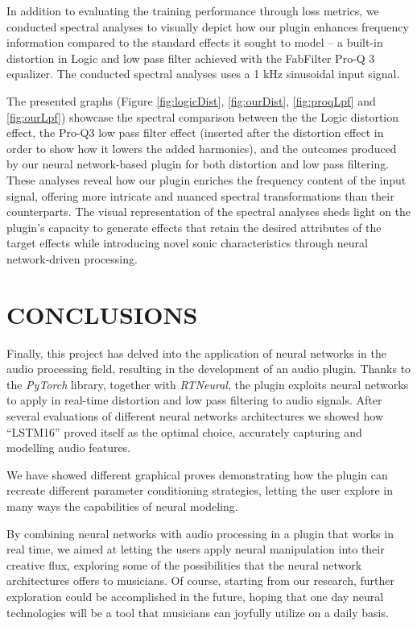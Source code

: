 \documentclass{article}
\newcommand{\quotes}[1]{``#1''}
\begin{document}
\begin{sloppy}
In addition to evaluating the training performance through loss metrics, we conducted spectral analyses to visually depict how our plugin enhances frequency information compared to the standard effects it sought to model – a built-in distortion in Logic and low pass filter achieved with the FabFilter Pro-Q 3 equalizer. The
conducted spectral analyses uses a 1 kHz sinusoidal input signal.

The presented graphs (Figure \ref{fig:logicDist}, \ref{fig:ourDist}, \ref{fig:proqLpf} and \ref{fig:ourLpf}) showcase the spectral comparison between the the Logic distortion effect, the Pro-Q3 low pass filter effect (inserted after the distortion effect in order to show how it lowers the added harmonics), and the outcomes produced by our neural network-based plugin for both distortion and low pass filtering. These analyses reveal how our plugin enriches the frequency content of the input signal, offering more intricate and nuanced spectral transformations than their counterparts. The visual representation of the spectral analyses sheds light on the plugin's capacity to generate effects that retain the desired attributes of the target effects while introducing novel sonic characteristics through neural network-driven processing.

\section{CONCLUSIONS}
\label{sec:conclusions}

Finally, this project has delved into the application of neural networks in the audio processing field, resulting in the development of an audio plugin. Thanks to the \emph{PyTorch} library, together with \emph{RTNeural}, the plugin exploits neural networks to apply in real-time distortion and low pass filtering to audio signals. After several evaluations of different neural networks architectures we showed how \quotes{LSTM16} proved itself as the optimal choice, accurately capturing and modelling audio features.

We have showed different graphical proves demonstrating how the plugin can recreate different parameter conditioning strategies, letting the user explore in many ways the capabilities of neural modeling.

By combining neural networks with audio processing in a plugin that works in real time, we aimed at letting the users apply neural manipulation into their creative flux, exploring some of the possibilities that the neural network architectures offers to musicians. Of course, starting from our research, further exploration could be accomplished in the future, hoping that one day neural technologies will be a tool that musicians can joyfully utilize on a daily basis.

\end{sloppy}
\end{document}
